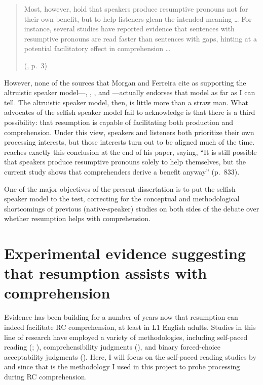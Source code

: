 \begin{quote}
Most, however, hold that speakers produce resumptive pronouns not for their own benefit, but to help listeners glean the intended meaning \dots{} For instance, several studies have reported evidence that sentences with resumptive pronouns are read faster than sentences with gaps, hinting at a potential facilitatory effect in comprehension \dots{}\par\vspace{5pt}
\hfill (\cite{morgan.ferreira2022}, p.~3)
\end{quote}
\vspace{-6pt}

However, none of the sources that Morgan and Ferreira cite as supporting the altruistic speaker model---\textcite{beltrama.xiang2016}, \textcite{hammerly2022}, \textcite{hofmeister.norcliffe2013}, and \textcite{zenker.schwartz2021a}---actually endorses that model as far as I can tell. The altruistic speaker model, then, is little more than a straw man. What advocates of the selfish speaker model fail to acknowledge is that there is a third possibility: that resumption is capable of facilitating both production and comprehension. Under this view, speakers and listeners both prioritize their own processing interests, but those interests turn out to be aligned much of the time. \textcite{hammerly2022} reaches exactly this conclusion at the end of his paper, saying, ``It is still possible that speakers produce resumptive pronouns solely to help themselves, but the current study shows that comprehenders derive a benefit anyway'' (p.~833).

One of the major objectives of the present dissertation is to put the selfish speaker model to the test, correcting for the conceptual and methodological shortcomings of previous (native-speaker) studies on both sides of the debate over whether resumption helps with comprehension.

\section{Experimental evidence suggesting that resumption assists with comprehension}\label{res-evidence-comprehension}

Evidence has been building for a number of years now that resumption can indeed facilitate RC comprehension, at least in L1 English adults. Studies in this line of research have employed a variety of methodologies, including self-paced reading (\cite{hammerly2022}; \cite{hofmeister.norcliffe2013}), comprehensibility judgments (\cite{beltrama.xiang2016}), and binary forced-choice acceptability judgments (\cite{ackerman.etal2018}). Here, I will focus on the self-paced reading studies by \textcite{hofmeister.norcliffe2013} and \textcite{hammerly2022} since that is the methodology I used in this project to probe processing during RC comprehension.

